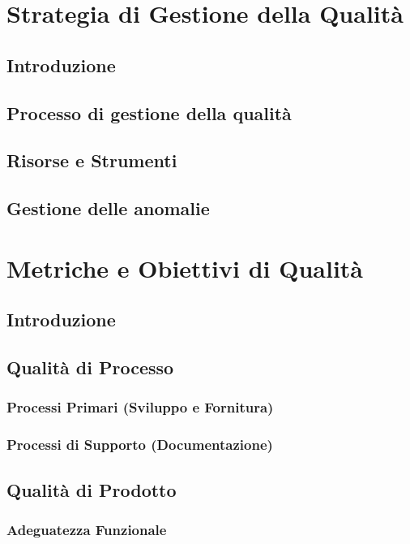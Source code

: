 \documentclass[11pt,a4paper]{article}
\begin{document}
\newpage

\section{Strategia di Gestione della Qualità}
\subsection{Introduzione}

\subsection{Processo di gestione della qualità}

\subsection{Risorse e Strumenti}

\subsection{Gestione delle anomalie}


\newpage
\section{Metriche e Obiettivi di Qualità}
\subsection{Introduzione}

\subsection{Qualità di Processo}
\subsubsection{Processi Primari (Sviluppo e Fornitura)}

\subsubsection{Processi di Supporto (Documentazione)}

\subsection{Qualità di Prodotto}
\subsubsection{Adeguatezza Funzionale}
\end{document}
